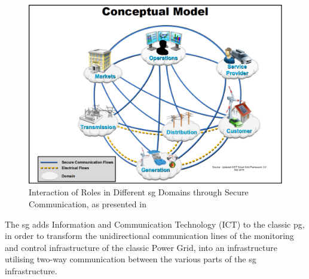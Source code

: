 \begin{figure}[ht]
\includegraphics[width=\linewidth]{figures/NIST-SmartGRID-ConceptualModel.png}
\caption[Interactions of roles in SmartGrid Domains]{Interaction of Roles in Different \acrlong{sg} Domains through Secure Communication, as presented in \cite{greer2014nist}}
\label{fig:NIST-SmartGRID-ConceptualModel}
\end{figure}






The \acrlong{sg} adds Information and Communication Technology (ICT) to the classic \acrlong{pg}, in order to transform the  unidirectional communication lines of the monitoring and control infrastructure of the classic Power Grid, into an infrastructure utilising two-way communication between the various parts of the \acrlong{sg} infrastructure. 








